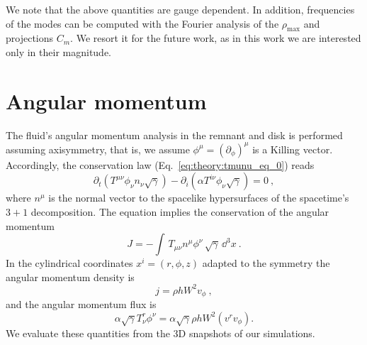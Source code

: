 %
We note that the above quantities are gauge dependent.
%
%
In addition, frequencies of the modes can be computed with the Fourier analysis 
of the $\rho_{\text{max}}$ and projections $C_{m}$. We resort it for the future work, 
as in this work we are interested only in their magnitude. 





\section{Angular momentum} \label{sec:bns_sims:method:ang_mom}



%

The fluid's angular momentum analysis in the remnant and disk is performed
assuming axisymmetry,
that is, we assume $\phi^{\mu} = (\partial_{\phi})^{\mu}$ is a Killing
vector. Accordingly, the conservation law (Eq.~\eqref{eq:theory:tmunu_eq_0}) 
reads
%
\begin{equation}
\partial_t(T^{\mu\nu}\phi_{\nu}n_{\nu}\sqrt{\gamma}) -
\partial_i(\alpha T^{i \nu}\phi_{\nu}\sqrt{\gamma}) = 0 \ ,
\end{equation}
%
where $n^\mu$ is the normal vector to the spacelike hypersurfaces of
the spacetime's $3+1$ decomposition.
%
The equation implies the conservation of the angular momentum 
\begin{equation}
J = %
-\int \,
T_{\mu\nu}n^{\mu}\phi^{\nu}\,\sqrt{\gamma}\, \dd^3 x\ .
\end{equation}
%
In the cylindrical coordinates $x^i=(r,\phi,z)$ adapted to the symmetry
the angular momentum density is  
%
\begin{equation}
j = %
\rho h W^2 v_{\phi} \ ,
\label{eq:method:ang_mom}
\end{equation}
%
and the angular momentum flux is 
%
\begin{equation}
\alpha\sqrt{\gamma}T^r _{\nu}\phi^{\nu} =
\alpha\sqrt{\gamma}\rho h W^2 (v^{r}v_{\phi}) .
\end{equation}
%
We evaluate these quantities from the 3D snapshots of our simulations.




